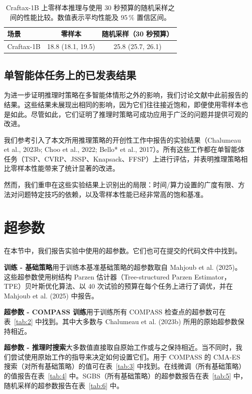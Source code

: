 \documentclass[11pt,UTF8,fontset=fandol]{ctexart}
\begin{document}
\begin{table}[H]\centering
\caption{Craftax-1B 上零样本推理与使用 30 秒预算的随机采样之间的性能比较。数值表示平均性能及 95\,\% 置信区间。}
\label{tab:1}
\begin{tabular}{lcc}
\toprule
场景 & 零样本 & 随机采样（30 秒预算）\\
\midrule
Craftax-1B & 18.8 (18.1, 19.5) & 25.8 (25.7, 26.1)\\
\bottomrule
\end{tabular}
\end{table}

\subsection{单智能体任务上的已发表结果}

为进一步证明推理时策略在多智能体情形之外的影响，我们讨论文献中此前报告的结果。这些结果未展现出相同的影响，因为它们往往接近饱和，即便使用零样本也是如此。尽管如此，它们证明了推理时策略可成功应用于广泛的问题并提供可观的改进。

我们参考引入了本文所用推理策略的开创性工作中报告的实验结果（Chalumeau et al., 2023b; Choo et al., 2022; Bello* et al., 2017）。所有这些工作都在单智能体任务（TSP、CVRP、JSSP、Knapsack、FFSP）上进行评估，并表明推理策略相比零样本性能带来了统计显著的改进。

然而，我们重申在这些实验结果上识别出的局限：时间/算力设置的广度有限、方法对问题特定技巧的依赖，以及零样本性能已经非常高的饱和基准。

\section{超参数}

在本节中，我们报告实验中使用的超参数。它们也可在提交的代码文件中找到。

\textbf{训练 - 基础策略}\quad 用于训练本基准基础策略的超参数取自 Mahjoub et al. (2025)。这些超参数使用树结构 Parzen 估计器（Tree-structured Parzen Estimator，TPE）贝叶斯优化算法、以 40 次试验的预算在每个任务上进行了调优，并在 Mahjoub et al. (2025) 中报告。

\textbf{超参数 - COMPASS 训练}\quad 用于训练所有 COMPASS 检查点的超参数可在表~\ref{tab:2} 中找到。其中大多数与 Chalumeau et al. (2023b) 所用的原始超参数保持相近。

\textbf{超参数 - 推理时搜索}\quad 大多数值直接取自原始工作或与之保持相近。当不同时，我们尝试使用原始工作的指导来决定如何设置它们。用于 COMPASS 的 CMA-ES 搜索（对所有基础策略）的值可在表~\ref{tab:3} 中找到。在线微调（所有基础策略）的值报告在表~\ref{tab:4} 中。SGBS（所有基础策略）的超参数报告在表~\ref{tab:5} 中，随机采样的超参数报告在表~\ref{tab:6} 中。
\end{document}
